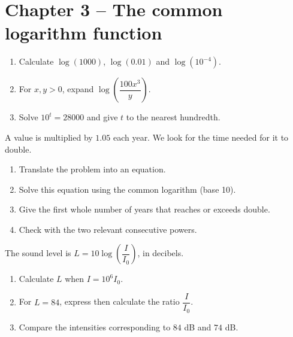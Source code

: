 \section*{Chapter 3 -- The common logarithm function}
\begin{exercice}
\begin{enumerate}
\item Calculate $\log(1000)$, $\log(0.01)$ and $\log(10^{-4})$.
\item For $x,y>0$, expand $\log\!\left(\dfrac{100x^3}{y} \right)$.
\item Solve $10^t=28000$ and give $t$ to the nearest hundredth.
\end{enumerate}
\end{exercice}
\begin{exercice}
A value is multiplied by $1.05$ each year. We look for the time needed for it to double.
\begin{enumerate}
\item Translate the problem into an equation.
\item Solve this equation using the common logarithm (base 10).
\item Give the first whole number of years that reaches or exceeds double.
\item Check with the two relevant consecutive powers.
\end{enumerate}
\end{exercice}
\begin{exercice}
The sound level is $L=10\log\!\left(\dfrac I{I_0}\right)$, in decibels.
\begin{enumerate}
\item Calculate $L$ when $I=10^6I_0$.
\item For $L=84$, express then calculate the ratio $\dfrac I{I_0}$.
\item Compare the intensities corresponding to $84$ dB and $74$ dB.
\end{enumerate}
\end{exercice}

